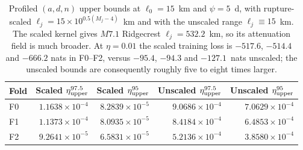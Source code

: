 \begin{table}[htbp]\centering\small
\setlength{\tabcolsep}{4pt}
\begin{tabular}{@{}lrrrr@{}}\toprule
Fold & Scaled $\eta^{97.5}_{\rm upper}$ & Scaled $\eta^{95}_{\rm upper}$ & Unscaled $\eta^{97.5}_{\rm upper}$ & Unscaled $\eta^{95}_{\rm upper}$\\\midrule
F0 & $1.1638\times10^{-4}$ & $8.2839\times10^{-5}$ & $9.0686\times10^{-4}$ & $7.0629\times10^{-4}$ \\
F1 & $1.1373\times10^{-4}$ & $8.0935\times10^{-5}$ & $8.4184\times10^{-4}$ & $6.4853\times10^{-4}$ \\
F2 & $9.2641\times10^{-5}$ & $6.5831\times10^{-5}$ & $5.2136\times10^{-4}$ & $3.8580\times10^{-4}$ \\
\bottomrule\end{tabular}
\caption{Profiled $(a,d,n)$ upper bounds at $\ell_0=15$~km and $\psi=5$~d, with rupture-scaled $\ell_j=15\times10^{0.5(M_j-4)}$~km and with the unscaled range $\ell_j\equiv15$~km. The scaled kernel gives $M7.1$ Ridgecrest $\ell_j=532.2$~km, so its attenuation field is much broader. At $\eta=0.01$ the scaled training loss is $-517.6$, $-514.4$ and $-666.2$ nats in F0--F2, versus $-95.4$, $-94.3$ and $-127.1$~nats unscaled; the unscaled bounds are consequently roughly five to eight times larger.}
\label{tab:california-eta-profiles-unscaled}
\end{table}



